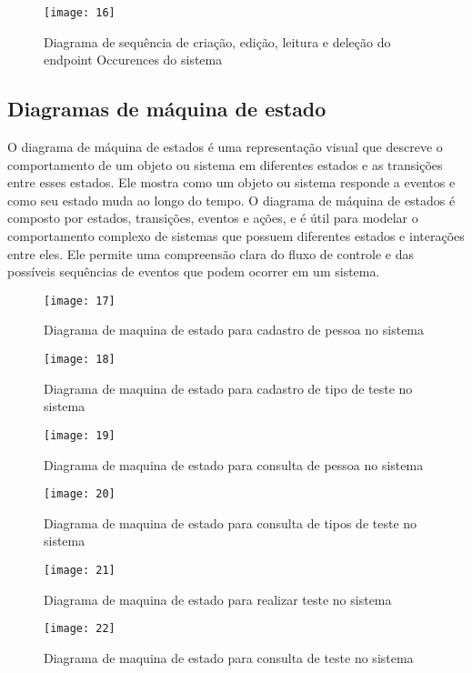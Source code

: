 \begin{figure}[h]
  \caption{Diagrama de sequência de criação, edição, leitura e deleção do endpoint Occurences do sistema}
  \centering
  \texttt{[image: 16]}
\end{figure}
\FloatBarrier

\subsection{Diagramas de máquina de estado \cite{30}}

O diagrama de máquina de estados é uma representação visual que descreve o comportamento de um objeto ou sistema em diferentes estados e as transições entre esses estados. Ele mostra como um objeto ou sistema responde a eventos e como seu estado muda ao longo do tempo. O diagrama de máquina de estados é composto por estados, transições, eventos e ações, e é útil para modelar o comportamento complexo de sistemas que possuem diferentes estados e interações entre eles. Ele permite uma compreensão clara do fluxo de controle e das possíveis sequências de eventos que podem ocorrer em um sistema.

\begin{figure}[h]
  \caption{Diagrama de maquina de estado para cadastro de pessoa no sistema}
  \centering
  \texttt{[image: 17]}
\end{figure}
\FloatBarrier

\begin{figure}[h]
  \caption{Diagrama de maquina de estado para cadastro de tipo de teste no sistema}
  \centering
  \texttt{[image: 18]}
\end{figure}
\FloatBarrier

\begin{figure}[h]
  \caption{Diagrama de maquina de estado para consulta de pessoa no sistema}
  \centering
  \texttt{[image: 19]}
\end{figure}
\FloatBarrier

\begin{figure}[h]
  \caption{Diagrama de maquina de estado para consulta de tipos de teste no sistema}
  \centering
  \texttt{[image: 20]}
\end{figure}
\FloatBarrier

\begin{figure}[h]
  \caption{Diagrama de maquina de estado para realizar teste no sistema}
  \centering
  \texttt{[image: 21]}
\end{figure}
\FloatBarrier

\begin{figure}[h]
  \caption{Diagrama de maquina de estado para consulta de teste no sistema}
  \centering
  \texttt{[image: 22]}
\end{figure}
\FloatBarrier
